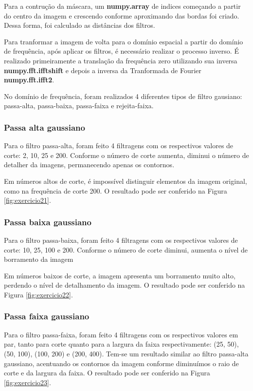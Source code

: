 \documentclass{article}
\begin{document}
Para a contrução da máscara, um \textbf{numpy.array} de indices começando a partir do centro da imagem e crescendo conforme aproximando das bordas foi criado. Dessa forma, foi calculado as distâncias dos filtros.

Para tranformar a imagem de volta para o domínio espacial a partir  do domínio de frequência, após aplicar os filtros, é necessário realizar o processo inverso. É realizado primeiramente a translação da frequência zero utilizando sua inversa \textbf{numpy.fft.ifftshift} e depois a inversa da Tranformada de Fourier \textbf{numpy.fft.ifft2}.

No domínio de frequência, foram realizados 4 diferentes tipos de filtro gausiano: passa-alta, passa-baixa, passa-faixa e rejeita-faixa.

\subsubsection{Passa alta gaussiano}

Para o filtro passa-alta, foram feito 4 filtragens com os respectivos valores de corte: 2, 10, 25 e 200. Conforme o número de corte aumenta, diminui o número de detalher da imagens, permanecendo apenas os contornos.

Em números altos de corte, é impossível distinguir elementos da imagem original, como na frequência de corte 200. O resultado pode ser conferido na Figura \ref{fig:exercicio21}.

\subsubsection{Passa baixa gaussiano}

Para o filtro passa-baixa, foram feito 4 filtragens com os respectivos valores de corte: 10, 25, 100 e 200. Conforme o número de corte diminui, aumenta o nível de borramento da imagem

Em números baixos de corte, a imagem apresenta um borramento muito alto, perdendo o nível de detalhamento da imagem. O resultado pode ser conferido na Figura \ref{fig:exercicio22}.

\subsubsection{Passa faixa gaussiano}

Para o filtro passa-faixa, foram feito 4 filtragens com os respectivos valores em par, tanto para corte quanto para a largura da faixa respectivamente: (25, 50), (50, 100), (100, 200) e (200, 400). 
Tem-se um resultado similar ao filtro passa-alta gaussiano, acentuando os contornos da imagem conforme diminuímos o raio de corte e da largura da faixa. O resultado pode ser conferido na Figura \ref{fig:exercicio23}.
\end{document}
